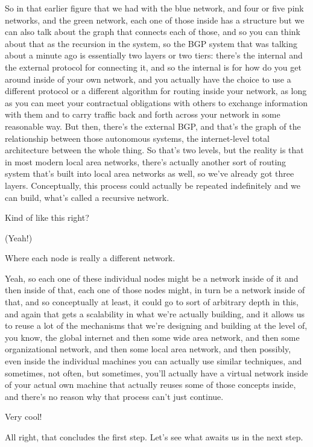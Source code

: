 \rrr So in that earlier figure that we had with the blue network, and four or five pink networks, and the green network, each one of those inside has a structure but we can also talk about the graph that connects each of those, and so you can think about that as the recursion in the system, so the BGP system that was talking about a minute ago is essentially two layers or two tiers: there's the internal and the external protocol for connecting it, and so the internal is for how do you get around inside of your own network, and you actually have the choice to use a different protocol or a different algorithm for routing inside your network, as long as you can meet your contractual obligations with others to exchange information with them and to carry traffic back and forth across your network in some reasonable way. But then, there's the external BGP, and that's the graph of the relationship between those autonomous systems, the internet-level total architecture between the whole thing. So that's two levels, but the reality is that in most modern local area networks, there's actually another sort of routing system that's built into local area networks as well, so we've already got three layers. Conceptually, this process could actually be repeated indefinitely and we can build, what's called a recursive network.

\mmm Kind of like this right? 

\rrr (Yeah!) 

\mmm Where each node is really a different network.

\rrr Yeah, so each one of these individual nodes might be a network inside of it and then inside of that, each one of those nodes might, in turn be a network inside of that, and so conceptually at least, it could go to sort of arbitrary depth in this, and again that gets a scalability in what we're actually building, and it allows us to reuse a lot of the mechanisms that we're designing and building at the level of, you know, the global internet and then some wide area network, and then some organizational network, and then some local area network, and then possibly, even inside the individual machines you can actually use similar techniques, and sometimes, not often, but sometimes, you'll actually have a virtual network inside of your actual own machine that actually reuses some of those concepts inside, and there's no reason why that process can't just continue.

\mmm Very cool!

All right, that concludes the first step. Let's see what awaits us in the next step.

